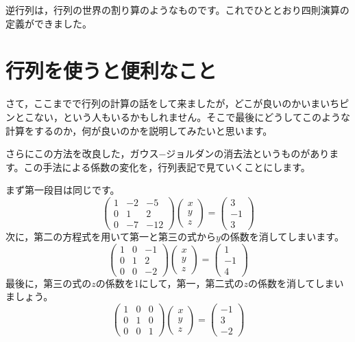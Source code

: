 逆行列は，行列の世界の割り算のようなものです。これでひととおり四則演算の定義ができました。

\section{行列を使うと便利なこと}
\label{MatrixAndEauqtion}
さて，ここまでで行列の計算の話をして来ましたが，どこが良いのかいまいちピンとこない，という人もいるかもしれません。そこで最後にどうしてこのような計算をするのか，何が良いのかを説明してみたいと思います。

さらにこの方法を改良した，ガウス−ジョルダンの消去法というものがあります。この手法による係数の変化を，行列表記で見ていくことにします。

まず第一段目は同じです。
\[
	\begin{pmatrix} 1 & -2 & -5  \\
                0 & 1  & 2   \\
                0 & -7 & -12\end{pmatrix}
	\begin{pmatrix} x \\ y \\ z \end{pmatrix}
	=
	\begin{pmatrix} 3 \\ -1 \\ 3 \end{pmatrix}
\]
次に，第二の方程式を用いて第一と第三の式から$y$の係数を消してしまいます。
\[
	\begin{pmatrix} 1 & 0 & -1 \\
                0 & 1 & 2  \\
                0 & 0 & -2\end{pmatrix}
	\begin{pmatrix} x \\ y \\ z \end{pmatrix}
	=
	\begin{pmatrix} 1 \\ -1 \\ 4 \end{pmatrix}
\]
最後に，第三の式の$z$の係数を1にして，第一，第二式の$z$の係数を消してしまいましょう。
\[
	\begin{pmatrix} 1 & 0 & 0 \\
                0 & 1 & 0 \\
                0 & 0 & 1\end{pmatrix}
	\begin{pmatrix} x \\ y \\ z \end{pmatrix}
	=
	\begin{pmatrix} -1 \\ 3 \\ -2 \end{pmatrix}
\]

